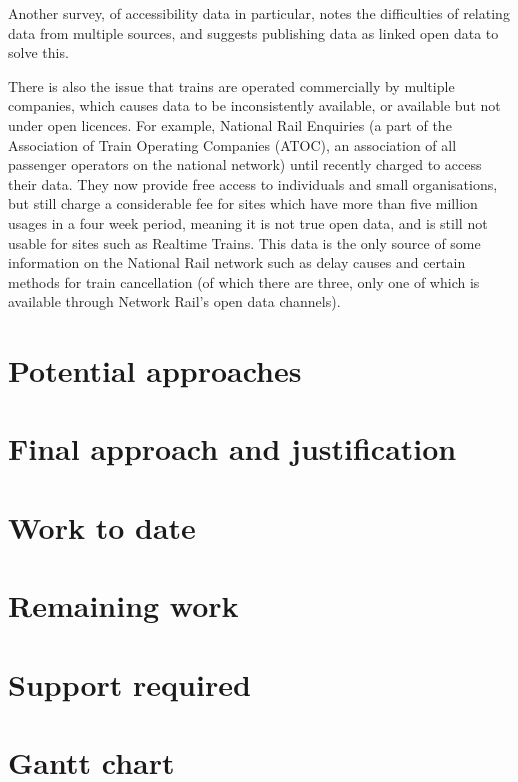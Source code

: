 \documentclass[a4paper,12pt]{article}
\begin{document}
Another survey, of accessibility data in particular, notes the difficulties of
relating data from multiple sources, and suggests publishing data as linked
open data to solve this\cite{Ding2014}.

There is also the issue that trains are operated commercially by multiple
companies, which causes data to be inconsistently available, or available but
not under open licences. For example, National Rail Enquiries (a part of the
Association of Train Operating Companies (ATOC), an association of all
passenger operators on the national network) until recently charged to access
their data. They now provide free access to individuals and small
organisations, but still charge a considerable fee for sites which have more
than five million usages in a four week period, meaning it is not true open
data, and is still not usable for sites such as Realtime Trains. This data is
the only source of some information on the National Rail network such as delay
causes and certain methods for train cancellation\cite{CairnsSeminar2013} (of
which there are three, only one of which is available through Network Rail's
open data channels).

\section{Potential approaches}

\section{Final approach and justification}

\section{Work to date}

\section{Remaining work}

\section{Support required}

\section{Gantt chart}




\end{document}
